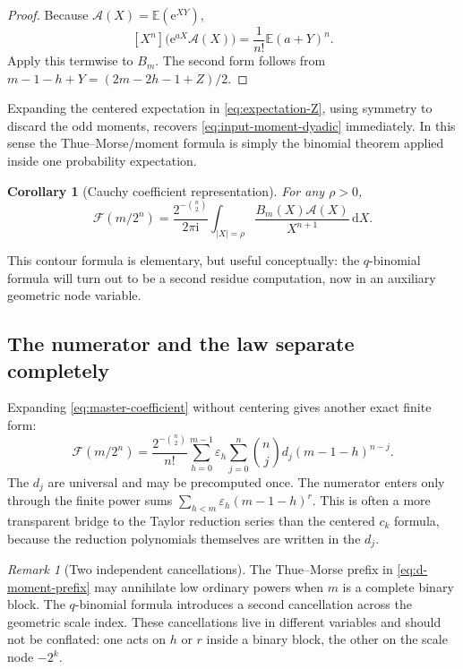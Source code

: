 \documentclass[11pt,oneside]{article}
\newtheorem{corollary}[theorem]{Corollary}
\theoremstyle{definition}
\theoremstyle{remark}
\newtheorem{remark}[theorem]{Remark}
\newcommand{\e}{\mathrm e}
\newcommand{\ii}{\mathrm i}
\newcommand{\dd}{\,\mathrm d}
\newcommand{\E}{\mathbb E}
\newcommand{\tm}{\varepsilon}
\begin{document}
\begin{proof}
Because $\mathscr A(X)=\E(\e^{XY})$,
\[
 [X^n]\bigl(\e^{aX}\mathscr A(X)\bigr)
 =\frac1{n!}\E(a+Y)^n.
\]
Apply this termwise to $B_m$.  The second form follows from
$m-1-h+Y=(2m-2h-1+Z)/2$.
\end{proof}

Expanding the centered expectation in \eqref{eq:expectation-Z}, using symmetry to discard the
odd moments, recovers \eqref{eq:input-moment-dyadic} immediately.  In this sense the
Thue--Morse/moment formula is simply the binomial theorem applied inside one probability
expectation.

\begin{corollary}[Cauchy coefficient representation]
\label{cor:cauchy-X}
For any $\rho>0$,
\begin{equation}
 \mathcal F(m/2^n)
 =\frac{2^{-\binom n2}}{2\pi\ii}
  \int_{|X|=\rho}\frac{B_m(X)\mathscr A(X)}{X^{n+1}}\dd X. \label{eq:cauchy-X}
\end{equation}
\end{corollary}

This contour formula is elementary, but useful conceptually: the $q$-binomial formula will
turn out to be a second residue computation, now in an auxiliary geometric node variable.

\subsection{The numerator and the law separate completely}

Expanding \eqref{eq:master-coefficient} without centering gives another exact finite form:
\begin{equation}
 \mathcal F(m/2^n)
 =\frac{2^{-\binom n2}}{n!}
 \sum_{h=0}^{m-1}\tm_h
 \sum_{j=0}^{n}\binom njd_j(m-1-h)^{n-j}.                 \label{eq:d-moment-prefix}
\end{equation}
The $d_j$ are universal and may be precomputed once.  The numerator enters only through the
finite power sums
\(
 \sum_{h<m}\tm_h(m-1-h)^r.
\)
This is often a more transparent bridge to the Taylor reduction series than the centered
$c_k$ formula, because the reduction polynomials themselves are written in the $d_j$.

\begin{remark}[Two independent cancellations]
The Thue--Morse prefix in \eqref{eq:d-moment-prefix} may annihilate low ordinary powers when
$m$ is a complete binary block.  The $q$-binomial formula introduces a second cancellation
across the geometric scale index.  These cancellations live in different variables and should
not be conflated: one acts on $h$ or $r$ inside a binary block, the other on the scale node
$-2^k$.
\end{remark}
\end{document}
